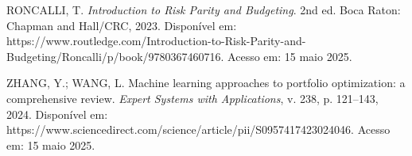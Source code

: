 \begin{thebibliography}{99}
RONCALLI, T. \textit{Introduction to Risk Parity and Budgeting}. 2nd ed. Boca Raton: Chapman and Hall/CRC, 2023. Disponível em: https://www.routledge.com/Introduction-to-Risk-Parity-and-Budgeting/Roncalli/p/book/9780367460716. Acesso em: 15 maio 2025.

ZHANG, Y.; WANG, L. Machine learning approaches to portfolio optimization: a comprehensive review. \textit{Expert Systems with Applications}, v. 238, p. 121--143, 2024. Disponível em: https://www.sciencedirect.com/science/article/pii/S0957417423024046. Acesso em: 15 maio 2025.

\end{thebibliography}
